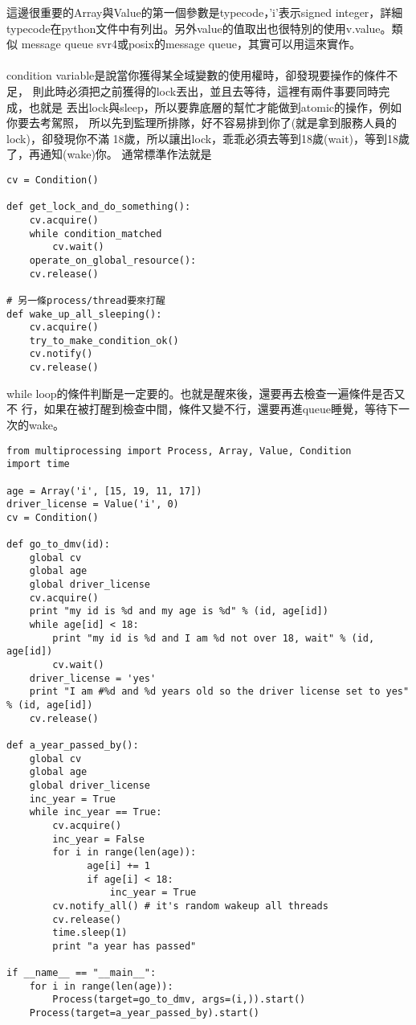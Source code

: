     這邊很重要的Array與Value的第一個參數是typecode，'i'表示signed integer，詳細
    typecode在python文件中有列出。另外value的值取出也很特別的使用v.value。類似
    message queue svr4或posix的message queue，其實可以用這來實作。
    \\\\
    condition variable是說當你獲得某全域變數的使用權時，卻發現要操作的條件不足，
    則此時必須把之前獲得的lock丟出，並且去等待，這裡有兩件事要同時完成，也就是
    丟出lock與sleep，所以要靠底層的幫忙才能做到atomic的操作，例如你要去考駕照，
    所以先到監理所排隊，好不容易排到你了(就是拿到服務人員的lock)，卻發現你不滿
    18歲，所以讓出lock，乖乖必須去等到18歲(wait)，等到18歲了，再通知(wake)你。
    通常標準作法就是
    \begin{verbatim}
cv = Condition()

def get_lock_and_do_something():
    cv.acquire()
    while condition_matched
        cv.wait()
    operate_on_global_resource():
    cv.release()

# 另一條process/thread要來打醒
def wake_up_all_sleeping():
    cv.acquire()
    try_to_make_condition_ok()
    cv.notify()
    cv.release()
    \end{verbatim}
    while loop的條件判斷是一定要的。也就是醒來後，還要再去檢查一遍條件是否又不
    行，如果在被打醒到檢查中間，條件又變不行，還要再進queue睡覺，等待下一次的wake。
    \begin{verbatim}
from multiprocessing import Process, Array, Value, Condition
import time

age = Array('i', [15, 19, 11, 17])
driver_license = Value('i', 0)
cv = Condition()

def go_to_dmv(id):
    global cv
    global age
    global driver_license
    cv.acquire()
    print "my id is %d and my age is %d" % (id, age[id])
    while age[id] < 18:
        print "my id is %d and I am %d not over 18, wait" % (id, age[id])
        cv.wait()
    driver_license = 'yes'
    print "I am #%d and %d years old so the driver license set to yes" % (id, age[id])
    cv.release()

def a_year_passed_by():
    global cv
    global age
    global driver_license
    inc_year = True
    while inc_year == True:
        cv.acquire()
        inc_year = False
        for i in range(len(age)):
              age[i] += 1
              if age[i] < 18:
                  inc_year = True
        cv.notify_all()	# it's random wakeup all threads
        cv.release()
        time.sleep(1)
        print "a year has passed"

if __name__ == "__main__":
    for i in range(len(age)):
        Process(target=go_to_dmv, args=(i,)).start()
    Process(target=a_year_passed_by).start()

    \end{verbatim}
